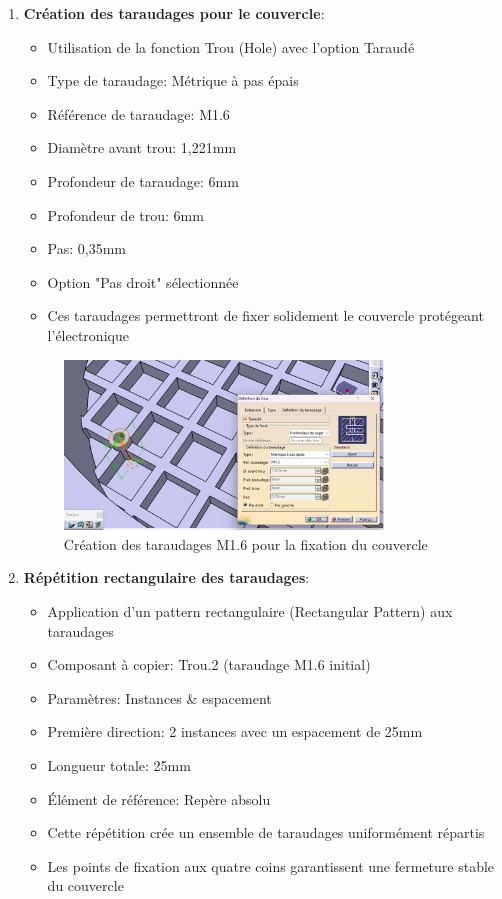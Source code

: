 \documentclass[a4paper,12pt]{report}
\begin{document}
\begin{enumerate}
    \item \textbf{Création des taraudages pour le couvercle}:
    \begin{itemize}
        \item Utilisation de la fonction Trou (Hole) avec l'option Taraudé
        \item Type de taraudage: Métrique à pas épais
        \item Référence de taraudage: M1.6
        \item Diamètre avant trou: 1,221mm
        \item Profondeur de taraudage: 6mm
        \item Profondeur de trou: 6mm
        \item Pas: 0,35mm
        \item Option "Pas droit" sélectionnée
        \item Ces taraudages permettront de fixer solidement le couvercle protégeant l'électronique
    \end{itemize}
    
    \begin{figure}[H]
        \centering
        \includegraphics[width=0.8\textwidth]{images/taraudage_couvercle.png}
        \caption{Création des taraudages M1.6 pour la fixation du couvercle}
        \label{fig:taraudage_couvercle}
    \end{figure}
    
    \item \textbf{Répétition rectangulaire des taraudages}:
    \begin{itemize}
        \item Application d'un pattern rectangulaire (Rectangular Pattern) aux taraudages
        \item Composant à copier: Trou.2 (taraudage M1.6 initial)
        \item Paramètres: Instances \& espacement
        \item Première direction: 2 instances avec un espacement de 25mm
        \item Longueur totale: 25mm
        \item Élément de référence: Repère absolu\Axe
        \item Cette répétition crée un ensemble de taraudages uniformément répartis
        \item Les points de fixation aux quatre coins garantissent une fermeture stable du couvercle
    \end{itemize}
    

\end{enumerate}
\end{document}
